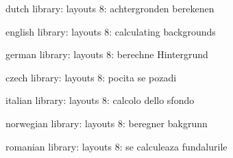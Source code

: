

\unprotect

\startmessages  dutch  library: layouts
      8: achtergronden berekenen
\stopmessages

\startmessages  english  library: layouts
      8: calculating backgrounds
\stopmessages

\startmessages  german  library: layouts
      8: berechne Hintergrund
\stopmessages

\startmessages  czech  library: layouts
      8: pocita se pozadi
\stopmessages

\startmessages  italian  library: layouts
      8: calcolo dello sfondo
\stopmessages

\startmessages  norwegian  library: layouts
      8: beregner bakgrunn
\stopmessages

\startmessages  romanian  library: layouts
      8: se calculeaza fundalurile
\stopmessages


\newif\ifnewbackground
\newif\ifsomebackground


\appendtoks
  \ifsomebackground \ifnewbackground \setsystemmode\v!achtergrond \fi \fi
\to \everybeforepagebody


